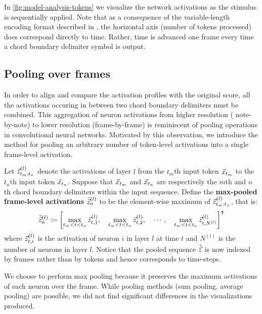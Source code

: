 In \cref{fig:model-analysis-tokens} we visualize the network activations as
the stimulus is sequentially applied. Note that as a consequence of the
variable-length encoding format described in , the horizontal axis
(number of tokens processed) does correspond directly to time. Rather, time
is advanced one frame every time a chord boundary delimiter symbol is output.


\subsection{Pooling over frames}

In order to align and compare the activation profiles with the original score,
all the activations occuring in between two chord boundary delimiters must be
combined. This aggregation of neuron activations from higher resolution (\ie
note-by-note) to lower resolution (\ie frame-by-frame) is reminiscent of
pooling operations in convolutional neural networks. Motivated by
this observation, we introduce the method for pooling an arbitrary number of
token-level activations into a single frame-level activation.

Let $\vec{z}^{(l)}_{{t_m}:{t_n}}$ denote the activations of layer $l$ from the $t_m$th input token $\vec{x}_{t_m}$
to the $t_n$th input token $\vec{x}_{t_n}$. Suppose that $\vec{x}_{t_m}$ and $\vec{x}_{t_n}$ are respectively the
$m$th and $n$th chord boundary delimiters within the input sequence. Define the
\textbf{max-pooled frame-level activations} $\tilde{\vec{z}}^{(l)}_n$ to be the
element-wise maximum of $\vec{z}^{(l)}_{{t_m}:{t_n}}$, that is:
\begin{equation}
    \tilde{\vec{z}}^{(l)}_n \coloneqq \left[
        \max_{t_m < t < t_n} \vec{z}^{(l)}_{t,1},\quad
        \max_{t_m < t < t_n} \vec{z}^{(l)}_{t,2},\quad
        \cdots,\quad
        \max_{t_m < t < t_n} \vec{z}^{(l)}_{t,N^{(l)}}
    \right]^\intercal
\end{equation}
where $\vec{z}^{(l)}_{t,i}$ is the activation of neuron $i$ in layer $l$ at time $t$
and $N^{(l)}$ is the number of neurons in layer $l$. Notice that the pooled
sequence $\tilde{\vec{z}}$ is now indexed by frames rather than by tokens and hence
corresponds to time-steps.

We choose to perform max pooling because it preserves the maximum activations
of each neuron over the frame. While pooling methods (\eg sum pooling, average
pooling) are possible, we did not find significant differences in the
visualizations produced.

